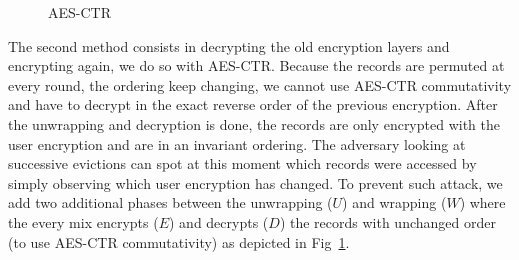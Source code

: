 \documentclass{llncs}
\newcommand{\squeezeup}{\vspace{-0.25cm}}
\begin{document}
\begin{figure}[t]
\centering
\begin{adjustbox}{width=\textwidth}
\centering 
{}
\end{adjustbox}
\caption{AES-CTR} \label{fig:AES}
\end{figure}
\squeezeup
The second method consists in decrypting the old encryption layers and encrypting again, we do so with AES-CTR. Because the records are permuted at every round, the ordering keep changing, we cannot use AES-CTR commutativity and have to decrypt in the exact reverse order of the previous encryption. After the unwrapping and decryption is done, the records are only encrypted with the user encryption and are in an invariant ordering. The adversary looking at successive evictions can spot at this moment which records were accessed by simply observing which user encryption has changed. To prevent such attack, we add two additional phases between the unwrapping ($U$) and wrapping ($W$) where the every mix encrypts ($E$) and decrypts ($D$) the records with unchanged order (to use AES-CTR commutativity) as depicted in Fig~\ref{fig:AES}. 
\iffalse
\squeezeup
\end{document}

